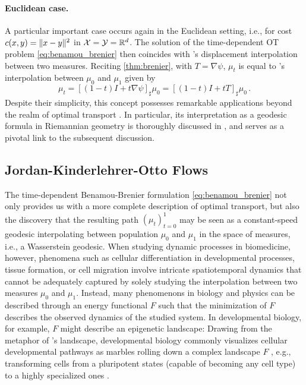\paragraph{Euclidean case.} A particular important case occurs again in the Euclidean setting, i.e., for cost $c(x, y) = \lVert x-y\rVert^2$ in ${\mathcal{X}} = {\mathcal{Y}} = \mathbb{R}^d$. The solution of the time-dependent OT problem \eqref{eq:benamou_brenier} then coincides with \citeauthor{mccann1997convexity}'s displacement interpolation between two measures.
Reciting \cref{thm:brenier}, with $T = \nabla \psi$, $\mu_t$ is equal to \citeauthor{mccann1997convexity}'s interpolation between $\mu_0$ and $\mu_1$ given by
\begin{equation} \label{eq:mccann_interpolation}
	\mu_t = [(1-t) I+t \nabla \psi]_\sharp \mu_0 = [(1-t) I+t T]_\sharp \mu_0\,.
\end{equation}
Despite their simplicity, this concept possesses remarkable applications beyond the realm of optimal transport \citep{bonneel2011displacement}. In particular, its interpretation as a geodesic formula in Riemannian geometry is thoroughly discussed in \citet{gangbo1996geometry}, and serves as a pivotal link to the subsequent discussion.


\subsection{Jordan-Kinderlehrer-Otto Flows} \label{sec:background_jko}

The time-dependent Benamou-Brenier formulation \eqref{eq:benamou_brenier} not only provides us with a more complete description of optimal transport, but also the discovery that the resulting path $(\mu_t)_{t=0}^1$ may be seen as a constant-speed geodesic interpolating between population $\mu_0$ and $\mu_1$ in the space of measures, i.e., a Wasserstein geodesic.
When studying dynamic processes in biomedicine, however, phenomena such as cellular differentiation in developmental processes, tissue formation, or cell migration involve intricate spatiotemporal dynamics that cannot be adequately captured by solely studying the interpolation between two measures $\mu_0$ and $\mu_1$.
Instead, many phenomenons in biology and physics can be described through an energy functional $F$ such that the minimization of $F$ describes the observed dynamics of the studied system.
In developmental biology, for example, $F$ might describe an epigenetic landscape: Drawing from the metaphor of \citeauthor{waddington1957strategy}'s landscape, developmental biology commonly visualizes cellular developmental pathways as marbles rolling down a complex landscape $F$ \citep{waddington1957strategy}, e.g., transforming cells from a pluripotent states (capable of becoming any cell type) to a highly specialized ones \citep{schiebinger2021reconstructing}. 

